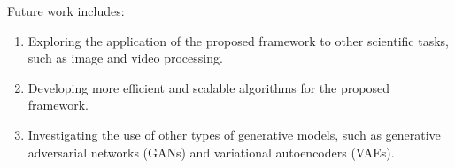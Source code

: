 \documentclass{article}
\begin{document}
        Future work includes:

        \begin{enumerate}
        \item Exploring the application of the proposed framework to other scientific tasks, such as image and video processing.
        \item Developing more efficient and scalable algorithms for the proposed framework.
        \item Investigating the use of other types of generative models, such as generative adversarial networks (GANs) and variational autoencoders (VAEs).
        \end{enumerate}

        
\end{document}
